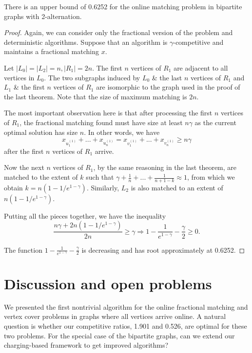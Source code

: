 \documentclass{article}
\begin{document}
\begin{proposition}
There is an upper bound of 0.6252 for the online matching problem in bipartite graphs with 2-alternation.
\end{proposition}
\begin{proof}
Again, we can consider only the fractional version of the problem and deterministic algorithms. Suppose that an algorithm is $\gamma$-competitive and maintains a fractional matching $x$.

Let $|L_0|=|L_2|=n,|R_1|=2n$. The first $n$ vertices of $R_1$ are adjacent to all vertices in $L_0$. The two subgraphs induced by $L_0$ \& the last $n$ vertices of $R_1$ and $L_1$ \& the first $n$ vertices of $R_1$ are isomorphic to the graph used in the proof of the last theorem. Note that the size of maximum matching is $2n$.

The most important observation here is that after processing the first $n$ vertices of $R_1$, the fractional matching found must have size at least $n\gamma$ as the current optimal solution has size $n$. In other words, we have $$x_{u_{1}^{(1)}}+...+x_{u_{n}^{(1)}}=x_{v_{1}^{(1)}}+...+x_{v_{n}^{(1)}}\geq n\gamma$$after the first $n$ vertices of $R_1$ arrive.

Now the next $n$ vertices of $R_1$, by the same reasoning in the last theorem, are matched to the extent of $k$ such that $\gamma + \frac{1}{n}+...+\frac{1}{n+1-k}\approx 1$, from which we obtain $k=n(1-1/e^{1-\gamma})$. Similarly, $L_2$ is also matched to an extent of $n(1-1/e^{1-\gamma})$.

Putting all the pieces together, we have the inequality $$\frac{n\gamma + 2n(1-1/e^{1-\gamma})}{2n}\geq \gamma\Rightarrow 1-\frac{1}{e^{1-\gamma}}-\frac{\gamma}{2}\geq0.$$

The function $1-\frac{1}{e^{1-\gamma}}-\frac{\gamma}{2}$ is decreasing and has root approximately at 0.6252.
\end{proof}




\section{Discussion and open problems}


We presented the first nontrivial algorithm for the online fractional matching and vertex cover problems in graphs where all vertices arrive online. A natural question is whether our competitive ratios, 1.901 and 0.526, are optimal for these two problems. For the special case of the bipartite graphs, can we extend our charging-based framework to get improved algorithms?
\end{document}
